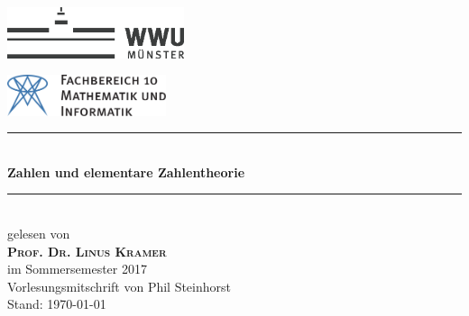 \begin{titlepage}
	\newcommand{\HRule}{\rule{\linewidth}{0.8mm}} %

	\center %
 
	\begin{minipage}{0.4\textwidth}
	\begin{flushleft}
	\includegraphics[height=1.5cm,keepaspectratio]{../!config/Bilder/wwulogo17.eps}\\[1cm]
	\end{flushleft}
	\end{minipage}
	\hfill
	\begin{minipage}{0.4\textwidth}
	\begin{flushright}
	\vspace*{0.3cm}
	\includegraphics[height=1.2cm,keepaspectratio]{../!config/Bilder/fb10logo.pdf} \
	\end{flushright}
	\end{minipage}

	\vspace{2cm}
	
	\HRule \\[0.8cm]
	{ \huge \sffamily\bfseries Zahlen und elementare Zahlentheorie}\\[0.4cm] %
	\HRule \\[1cm]
 
	{\LARGE gelesen von} \\[.7cm]
	\textsc{\LARGE \textbf{Prof. Dr. Linus Kramer}}\\[.7cm]
	{\LARGE im Sommersemester 2017}\\[2cm]


	\vfill
	{\Large Vorlesungsmitschrift von Phil Steinhorst} \\[.5cm]
	{\large Stand: \today}
	
\end{titlepage}